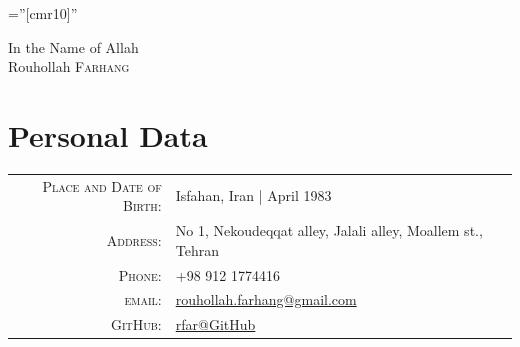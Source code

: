 \documentclass[a4paper,10pt]{article}
\begin{document}

\pagestyle{empty} %

\font\fb=''[cmr10]'' %

\par{\centering
		{\small In the Name of Allah}\\
		\vspace{22mm}
		{\Huge Rouhollah \textsc{Farhang}
	}\bigskip\par}

\section{Personal Data}


\begin{tabular}{rl}
    \textsc{Place and Date of Birth:} & Isfahan, Iran | April 1983 \\
    \textsc{Address:}   & No 1, Nekoudeqqat alley, Jalali alley, Moallem st., Tehran\\
    \textsc{Phone:}     & +98 912 1774416\\
    \textsc{email:}     & \href{mailto:rouhollah.farhang@gmail.com}{rouhollah.farhang@gmail.com}\\
    \textsc{GitHub:}	& \href{https://github.com/rfar}{rfar@GitHub}
\end{tabular}


\end{document}
